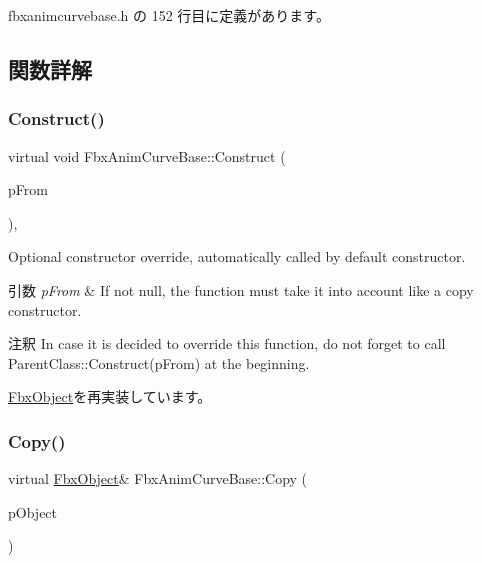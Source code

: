  fbxanimcurvebase.\+h の 152 行目に定義があります。



\subsection{関数詳解}
\mbox{\label{class_fbx_anim_curve_base_af8e0d506c1a09c9fbd7432d4eb5caa02}} 
\subsubsection{\texorpdfstring{Construct()}{Construct()}}
{\footnotesize\ttfamily virtual void Fbx\+Anim\+Curve\+Base\+::\+Construct (\begin{DoxyParamCaption}\item[{const \hyperlink{class_fbx_object}{Fbx\+Object} $\ast$}]{p\+From }\end{DoxyParamCaption})\hspace{0.3cm}{\ttfamily [protected]}, {\ttfamily [virtual]}}

Optional constructor override, automatically called by default constructor. 
\begin{DoxyParams}{引数}
{\em p\+From} & If not null, the function must take it into account like a copy constructor. \\
\hline
\end{DoxyParams}
\begin{DoxyRemark}{注釈}
In case it is decided to override this function, do not forget to call Parent\+Class\+::\+Construct(p\+From) at the beginning. 
\end{DoxyRemark}


\hyperlink{class_fbx_object_a313503bc645af3fdceb4a99ef5cea7eb}{Fbx\+Object}を再実装しています。

\mbox{\label{class_fbx_anim_curve_base_abdd0a239c39552fe978b1b571a4d5465}} 
\subsubsection{\texorpdfstring{Copy()}{Copy()}}
{\footnotesize\ttfamily virtual \hyperlink{class_fbx_object}{Fbx\+Object}\& Fbx\+Anim\+Curve\+Base\+::\+Copy (\begin{DoxyParamCaption}\item[{const \hyperlink{class_fbx_object}{Fbx\+Object} \&}]{p\+Object }\end{DoxyParamCaption})\hspace{0.3cm}{\ttfamily [virtual]}}

